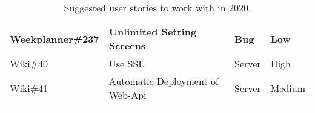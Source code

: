 \begin{longtable}{|p{2.9cm}|p{7cm}|p{1.4cm}|p{1.5cm}|}
    Weekplanner\#237 & Unlimited Setting Screens                                                                                                                                                 & Bug        & Low   \\ \hline
    Wiki\#40         & Use SSL                                                                                                                                                                   & Server     & High  \\ \hline
    Wiki\#41         & Automatic Deployment of Web-Api                                                                                                                                           & Server     & Medium     \\ \hline  
    \caption{Suggested user stories to work with in 2020.}
\end{longtable}
